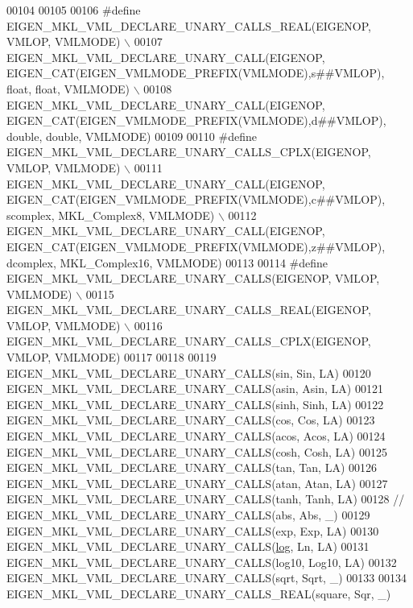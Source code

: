 \begin{DoxyCode}
00104 \textcolor{preprocessor}{}
00105 
00106 \textcolor{preprocessor}{#define EIGEN\_MKL\_VML\_DECLARE\_UNARY\_CALLS\_REAL(EIGENOP, VMLOP, VMLMODE)                                    
                           \(\backslash\)}
00107 \textcolor{preprocessor}{  EIGEN\_MKL\_VML\_DECLARE\_UNARY\_CALL(EIGENOP, EIGEN\_CAT(EIGEN\_VMLMODE\_PREFIX(VMLMODE),s##VMLOP), float,
       float, VMLMODE)           \(\backslash\)}
00108 \textcolor{preprocessor}{  EIGEN\_MKL\_VML\_DECLARE\_UNARY\_CALL(EIGENOP, EIGEN\_CAT(EIGEN\_VMLMODE\_PREFIX(VMLMODE),d##VMLOP), double,
       double, VMLMODE)}
00109 
00110 \textcolor{preprocessor}{#define EIGEN\_MKL\_VML\_DECLARE\_UNARY\_CALLS\_CPLX(EIGENOP, VMLOP, VMLMODE)                                    
                           \(\backslash\)}
00111 \textcolor{preprocessor}{  EIGEN\_MKL\_VML\_DECLARE\_UNARY\_CALL(EIGENOP, EIGEN\_CAT(EIGEN\_VMLMODE\_PREFIX(VMLMODE),c##VMLOP), scomplex,
       MKL\_Complex8, VMLMODE) \(\backslash\)}
00112 \textcolor{preprocessor}{  EIGEN\_MKL\_VML\_DECLARE\_UNARY\_CALL(EIGENOP, EIGEN\_CAT(EIGEN\_VMLMODE\_PREFIX(VMLMODE),z##VMLOP), dcomplex,
       MKL\_Complex16, VMLMODE)}
00113   
00114 \textcolor{preprocessor}{#define EIGEN\_MKL\_VML\_DECLARE\_UNARY\_CALLS(EIGENOP, VMLOP, VMLMODE)                                         
                           \(\backslash\)}
00115 \textcolor{preprocessor}{  EIGEN\_MKL\_VML\_DECLARE\_UNARY\_CALLS\_REAL(EIGENOP, VMLOP, VMLMODE)                                          
                           \(\backslash\)}
00116 \textcolor{preprocessor}{  EIGEN\_MKL\_VML\_DECLARE\_UNARY\_CALLS\_CPLX(EIGENOP, VMLOP, VMLMODE)}
00117 
00118   
00119 EIGEN\_MKL\_VML\_DECLARE\_UNARY\_CALLS(sin,   Sin,   LA)
00120 EIGEN\_MKL\_VML\_DECLARE\_UNARY\_CALLS(asin,  Asin,  LA)
00121 EIGEN\_MKL\_VML\_DECLARE\_UNARY\_CALLS(sinh,  Sinh,  LA)
00122 EIGEN\_MKL\_VML\_DECLARE\_UNARY\_CALLS(cos,   Cos,   LA)
00123 EIGEN\_MKL\_VML\_DECLARE\_UNARY\_CALLS(acos,  Acos,  LA)
00124 EIGEN\_MKL\_VML\_DECLARE\_UNARY\_CALLS(cosh,  Cosh,  LA)
00125 EIGEN\_MKL\_VML\_DECLARE\_UNARY\_CALLS(tan,   Tan,   LA)
00126 EIGEN\_MKL\_VML\_DECLARE\_UNARY\_CALLS(atan,  Atan,  LA)
00127 EIGEN\_MKL\_VML\_DECLARE\_UNARY\_CALLS(tanh,  Tanh,  LA)
00128 \textcolor{comment}{// EIGEN\_MKL\_VML\_DECLARE\_UNARY\_CALLS(abs,   Abs,    \_)}
00129 EIGEN\_MKL\_VML\_DECLARE\_UNARY\_CALLS(exp,   Exp,   LA)
00130 EIGEN\_MKL\_VML\_DECLARE\_UNARY\_CALLS(\hyperlink{structlog}{log},   Ln,    LA)
00131 EIGEN\_MKL\_VML\_DECLARE\_UNARY\_CALLS(log10, Log10, LA)
00132 EIGEN\_MKL\_VML\_DECLARE\_UNARY\_CALLS(sqrt,  Sqrt,  \_)
00133 
00134 EIGEN\_MKL\_VML\_DECLARE\_UNARY\_CALLS\_REAL(square, Sqr,   \_)

\end{DoxyCode}
